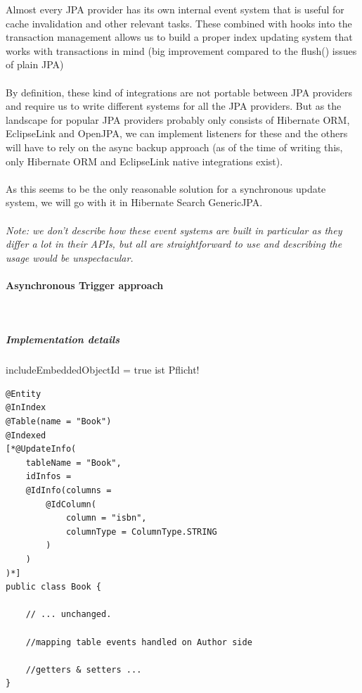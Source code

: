 Almost every JPA provider has its own internal event system that is useful for cache invalidation and other relevant tasks. These combined with hooks into the transaction management allows us to build a proper index updating system that works with transactions in mind (big improvement compared to the flush() issues of plain JPA)
\\\\
By definition, these kind of integrations are not portable between JPA providers and require us to write different systems for all the JPA providers. But as the landscape for popular JPA providers probably only consists of Hibernate ORM, EclipseLink and OpenJPA, we can implement listeners for these and the others will have to rely on the async backup approach (as of the time of writing this, only Hibernate ORM and EclipseLink native integrations exist).
\\\\
As this seems to be the only reasonable solution for a synchronous update system, we will go with it in Hibernate Search GenericJPA.
\\\\
\textit{Note: we don't describe how these event systems are built in particular as they differ a lot in their APIs, but all are straightforward to use and describing the usage would be unspectacular.}

\paragraph{Asynchronous Trigger approach}
~\\



\subparagraph{Implementation details}

includeEmbeddedObjectId = true ist Pflicht!

\lstset{language=java}
\begin{lstlisting}[frame=htrbl, caption={Book.java with Hibernate Search annotations}, label={lst:book.java_3}]
@Entity
@InIndex
@Table(name = "Book")
@Indexed
[*@UpdateInfo(
	tableName = "Book", 
	idInfos = 
	@IdInfo(columns = 
		@IdColumn(
			column = "isbn", 
			columnType = ColumnType.STRING
		)
	)
)*]
public class Book {

	// ... unchanged. 
	
	//mapping table events handled on Author side
	
	//getters & setters ...
}
\end{lstlisting}

